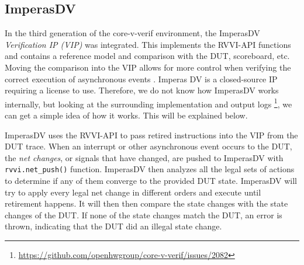 %    


\subsection{ImperasDV}
\label{sec:imperasdv}

In the third generation of the core-v-verif environment, the ImperasDV \textit{Verification IP (VIP)} was integrated. This implements the RVVI-API functions and contains a reference model and comparison with the DUT, scoreboard, etc. Moving the comparison into the VIP allows for more control when verifying the correct execution of asynchronous events \cite{taylorAdvancedRISCVVerification2023}. Imperas DV is a closed-source IP requiring a license to use. Therefore, we do not know how ImperasDV works internally, but looking at the surrounding implementation \cite{openhwgroupOpenhwgroupCorevverif2023} and output logs \footnote{\url{https://github.com/openhwgroup/core-v-verif/issues/2082}}, we can get a simple idea of how it works. This will be explained below.

ImperasDV uses the RVVI-API to pass retired instructions into the VIP from the DUT trace. When an interrupt or other asynchronous event occurs to the DUT, the \textit{net changes}, or signals that have changed, are pushed to ImperasDV with \lstinline{rvvi.net_push()} function. ImperasDV then analyzes all the legal sets of actions to determine if any of them converge to the provided DUT state. ImperasDV will try to apply every legal net change in different orders and execute until retirement happens. It will then then compare the state changes with the state changes of the DUT. If none of the state changes match the DUT, an error is thrown, indicating that the DUT did an illegal state change.


